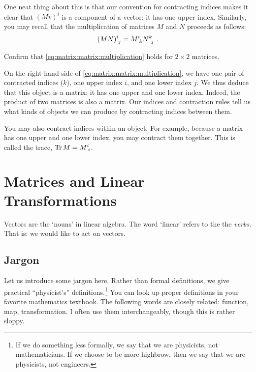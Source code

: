\documentclass[12pt]{article}
\begin{document}
One neat thing about this is that our convention for contracting indices makes it clear that $(Mv)^i$ is a component of a vector: it has one upper index. Similarly, you may recall that the multiplication of matrices $M$ and $N$ proceeds as follows:
\begin{align}
 (MN)\aij{i}{j} = M\aij{i}{k}N\aij{k}{j} \ .
 \label{eq:matrix:matrix:multiplication}    
\end{align}
\begin{exercise}
Confirm that \eqref{eq:matrix:matrix:multiplication} holds for $2\times 2$ matrices.
\end{exercise}
On the right-hand side of \eqref{eq:matrix:matrix:multiplication}, we have one pair of contracted indices ($k$), one upper index $i$, and one lower index $j$. We thus deduce that this object is a matrix: it has one upper and one lower index. Indeed, the product of two matrices is also a matrix. Our indices and contraction rules tell us what kinds of objects we can produce by contracting indices between them. 

\begin{example}
You may also contract indices within an object. For example, because a matrix has one upper and one lower index, you may contract them together. This is called the trace, $\Tr M = M\aij{i}{i}$.
\end{example}





\section{Matrices and Linear Transformations}

Vectors are the `nouns' in linear algebra. The word `linear' refers to the the \emph{verbs}. That is: we would like to act on vectors. 







\subsection{Jargon}\label{sec:jargon:linear:map}
Let us introduce some jargon here. Rather than formal definitions, we give practical ``physicist's'' definitions.\footnote{If we do something less formally, we say that we are physicists, not mathematicians. If we choose to be more highbrow, then we say that we are physicists, not engineers.} You can look up proper definitions in your favorite mathematics textbook.  The following words are closely related: function, map, transformation. I often use them interchangeably, though this is rather sloppy.  
\end{document}
